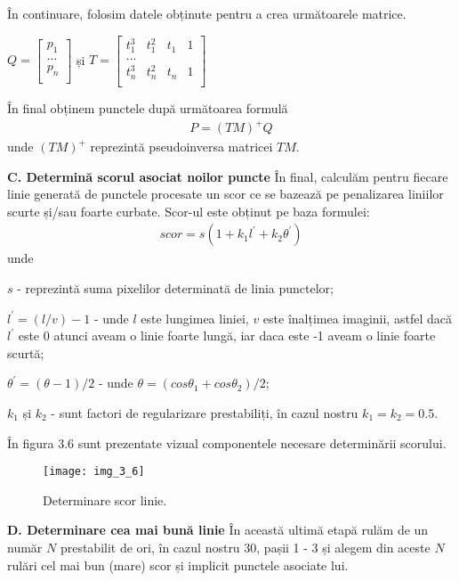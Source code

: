 În continuare, folosim datele obținute pentru a crea următoarele matrice.
\begin{center}
	$ Q = 
	\begin{bmatrix}
	p_1 \\
	... \\
	p_n \\
	\end{bmatrix}
	$ și $ T = 
	\begin{bmatrix}
	t_1^3 & t_1^2 & t_1 & 1 \\
	...\\
	t_n^3 & t_n^2 & t_n & 1\\
	\end{bmatrix}
	$
\end{center}

În final obținem punctele după următoarea formulă
\begin{align}
	P = (TM)^+Q
\end{align}
unde $(TM)^+$ reprezintă pseudoinversa matricei $TM$.

\textbf{C. Determină scorul asociat noilor puncte}
În final, calculăm pentru fiecare linie generată de punctele procesate un scor ce se bazează pe penalizarea liniilor scurte și/sau foarte curbate. Scor-ul este obținut pe baza formulei:
\begin{align}
	scor = s(1 + k_1l^{'}+k_2\theta^{'})
\end{align}
unde

$s$ - reprezintă suma pixelilor determinată de linia punctelor;

$l^{'} = (l/v) - 1$ - unde $l$ este lungimea liniei, $v$ este înalțimea imaginii, astfel dacă $l^{'}$ este 0 atunci aveam o linie foarte lungă, iar daca este -1 aveam o linie foarte scurtă;

$\theta^{'} = (\theta - 1)/2$ - unde $\theta = (cos\theta_1 + cos\theta_2)/2$;

$k_1$ și $k_2$ - sunt factori de regularizare prestabiliți, în cazul nostru $k_1 = k_2 = 0.5$.

În figura 3.6 sunt prezentate vizual componentele necesare determinării scorului.
\begin{figure}[!h]
	\centering
	\texttt{[image: img\_3\_6]}
	\caption{Determinare scor linie.}
\end{figure}

\textbf{D. Determinare cea mai bună linie}
În această ultimă etapă rulăm de un număr $N$ prestabilit de ori, în cazul nostru 30, pașii 1 - 3 și alegem din aceste $N$ rulări cel mai bun (mare) scor și implicit punctele asociate lui.

